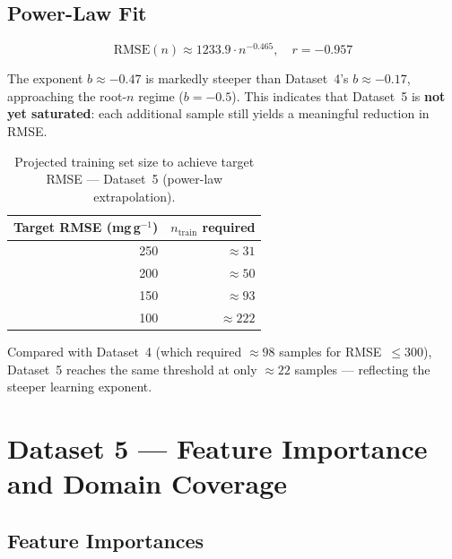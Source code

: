\documentclass[12pt,a4paper]{article}
\begin{document}
\subsection{Power-Law Fit}

\begin{equation}
\text{RMSE}(n) \approx 1233.9 \cdot n^{-0.465}, \quad r = -0.957
\end{equation}

The exponent $b \approx -0.47$ is markedly steeper than Dataset~4's
$b \approx -0.17$, approaching the root-$n$ regime ($b = -0.5$).
This indicates that Dataset~5 is \textbf{not yet saturated}: each
additional sample still yields a meaningful reduction in RMSE.

\begin{table}[h]
\centering
\caption{Projected training set size to achieve target RMSE —
  Dataset~5 (power-law extrapolation).}
\label{tab:ds5_projection}
\begin{tabular}{rr}
\toprule
Target RMSE (mg\,g$^{-1}$) & $n_\text{train}$ required \\
\midrule
250  & $\approx 31$ \\
200  & $\approx 50$ \\
150  & $\approx 93$ \\
100  & $\approx 222$ \\
\bottomrule
\end{tabular}
\end{table}

Compared with Dataset~4 (which required $\approx 98$ samples for
RMSE~$\leq 300$), Dataset~5 reaches the same threshold at only
$\approx 22$ samples — reflecting the steeper learning exponent.

\section{Dataset 5 — Feature Importance and Domain Coverage}
\label{sec:ds5_features}

\subsection{Feature Importances}
\end{document}
